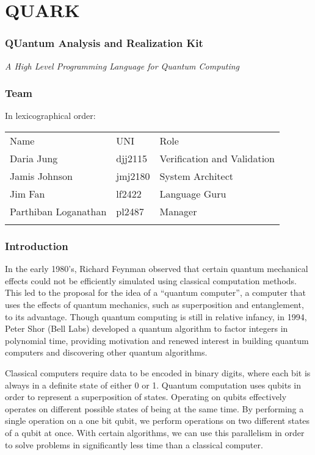 \documentclass[]{article}
\date{}
\begin{document}
\section{QUARK}\label{quark}

\subsubsection{QUantum Analysis and Realization
Kit}\label{quantum-analysis-and-realization-kit}

\emph{A High Level Programming Language for Quantum Computing}

\subsubsection{Team}\label{team}

In lexicographical order:

\begin{longtable}[c]{@{}lll@{}}
\toprule\addlinespace
Name & UNI & Role
\\\addlinespace
\midrule\endhead
Daria Jung & djj2115 & Verification and Validation
\\\addlinespace
Jamis Johnson & jmj2180 & System Architect
\\\addlinespace
Jim Fan & lf2422 & Language Guru
\\\addlinespace
Parthiban Loganathan & pl2487 & Manager
\\\addlinespace
\bottomrule
\end{longtable}

\subsubsection{Introduction}\label{introduction}

In the early 1980's, Richard Feynman observed that certain quantum
mechanical effects could not be efficiently simulated using classical
computation methods. This led to the proposal for the idea of a
``quantum computer'', a computer that uses the effects of quantum
mechanics, such as superposition and entanglement, to its advantage.
Though quantum computing is still in relative infancy, in 1994, Peter
Shor (Bell Labs) developed a quantum algorithm to factor integers in
polynomial time, providing motivation and renewed interest in building
quantum computers and discovering other quantum algorithms.

Classical computers require data to be encoded in binary digits, where
each bit is always in a definite state of either 0 or 1. Quantum
computation uses qubits in order to represent a superposition of states.
Operating on qubits effectively operates on different possible states of
being at the same time. By performing a single operation on a one bit
qubit, we perform operations on two different states of a qubit at once.
With certain algorithms, we can use this parallelism in order to solve
problems in significantly less time than a classical computer.
\end{document}
